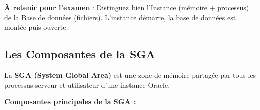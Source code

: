 \documentclass[11pt,a4paper]{article}
\begin{document}
\begin{tipbox}
\textbf{À retenir pour l'examen} : Distinguez bien l'Instance (mémoire + processus) de la Base de données (fichiers). L'instance démarre, la base de données est montée puis ouverte.
\end{tipbox}

\subsection{Les Composantes de la SGA}

\begin{definitionbox}
La \textbf{SGA (System Global Area)} est une zone de mémoire partagée par tous les processus serveur et utilisateur d'une instance Oracle.
\end{definitionbox}

\textbf{Composantes principales de la SGA :}
\end{document}
